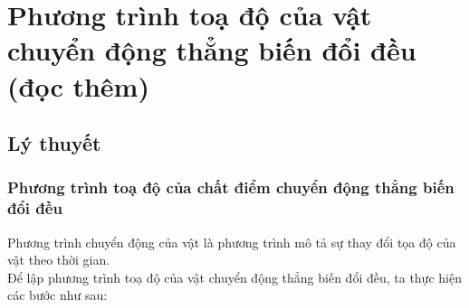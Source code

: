 \let\lesson\undefined
\newcommand{\lesson}{\phantomlesson{Bài 7: Gia tốc. Chuyển động thẳng biến đổi đều}}
\chapter[Phương trình toạ độ của vật chuyển động thẳng biến đổi đều (đọc thêm)]{Phương trình toạ độ của vật chuyển động thẳng biến đổi đều (đọc thêm)}
\setcounter{section}{0}
\section{Lý thuyết}
\subsection{Phương trình toạ độ của chất điểm chuyển động thẳng biến đổi đều}
Phương trình chuyển động của vật là phương trình mô tả sự thay đổi tọa độ của vật theo thời gian. \\
Để lập phương trình toạ độ của vật chuyển động thẳng biến đổi đều, ta thực hiện các bước như sau:

